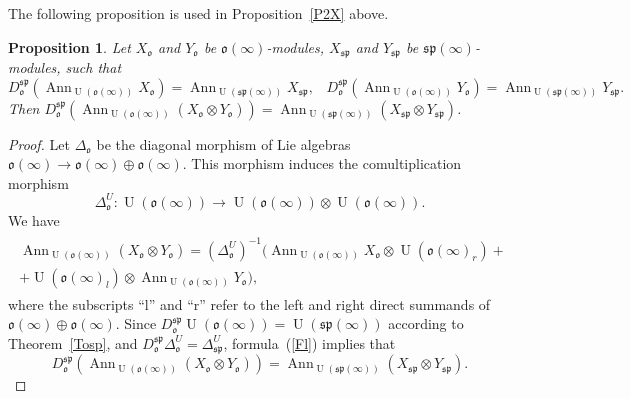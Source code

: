 \documentclass{emsprocart}
\newtheorem{proposition}[theorem]{Proposition}
\begin{document}
The following proposition is used in Proposition~\ref{P2X} above.
\begin{proposition}\label{Ltd}Let $X_\mathfrak o$ and $Y_\mathfrak o$ be $\mathfrak o(\infty)$-modules, $X_{\mathfrak{sp}}$ and $Y_{\mathfrak{sp}}$ be $\mathfrak{sp}(\infty)$-modules, such that $$D_\mathfrak o^\mathfrak{sp}(\operatorname{Ann}_{\operatorname{U}(\mathfrak o(\infty))}X_\mathfrak o)=\operatorname{Ann}_{\operatorname{U}(\mathfrak{sp}(\infty))}X_\mathfrak{sp},\hspace{10pt}D_\mathfrak o^\mathfrak{sp}(\operatorname{Ann}_{\operatorname{U}(\mathfrak o(\infty))}Y_\mathfrak o)=\operatorname{Ann}_{\operatorname{U}(\mathfrak{sp}(\infty))}Y_\mathfrak{sp}.$$ Then $D_\mathfrak o^\mathfrak{sp}(\operatorname{Ann}_{\operatorname{U}(\mathfrak o(\infty))}(X_\mathfrak o\otimes Y_\mathfrak o))=\operatorname{Ann}_{\operatorname{U}(\mathfrak{sp}(\infty))}(X_\mathfrak{sp}\otimes Y_{\mathfrak{sp}})$.\end{proposition}
\begin{proof}%
Let $\Delta_\mathfrak o$ be the diagonal morphism of Lie algebras $\mathfrak o(\infty)\to\mathfrak o(\infty)\oplus\mathfrak o(\infty)$. This morphism induces the comultiplication morphism
$$\Delta_\mathfrak o^U: \operatorname{U}(\mathfrak o(\infty))\to \operatorname{U}(\mathfrak o(\infty))\otimes\operatorname{U}(\mathfrak o(\infty)).$$We have
\begin{eqnarray}\begin{aligned}\label{Fl}\operatorname{Ann}_{\operatorname{U}(\mathfrak o(\infty))}(X_\mathfrak o\otimes Y_\mathfrak o)=(\Delta^U_\mathfrak o)^{-1}(\operatorname{Ann}_{\operatorname{U}(\mathfrak o(\infty))}X_\mathfrak o\otimes\operatorname{U}(\mathfrak o(\infty)_r)+\\+\operatorname{U}(\mathfrak o(\infty)_l)\otimes\operatorname{Ann}_{\operatorname{U}(\mathfrak o(\infty))}Y_\mathfrak o),\end{aligned}\end{eqnarray}where the subscripts ``l'' and ``r'' refer to the left and right direct summands of $\mathfrak o(\infty)\oplus\mathfrak o(\infty)$.
Since $D_\mathfrak o^\mathfrak{sp}\operatorname{U}(\mathfrak o(\infty))=\operatorname{U}(\mathfrak{sp}(\infty))$ according to Theorem~\ref{Tosp}, and $D_\mathfrak o^\mathfrak{sp}\Delta_\mathfrak o^U=\Delta_\mathfrak{sp}^U
$, formula~(\ref{Fl}) implies that $$D_\mathfrak o^\mathfrak{sp}(\operatorname{Ann}_{\operatorname{U}(\mathfrak o(\infty))}(X_\mathfrak o\otimes Y_\mathfrak o))=\operatorname{Ann}_{\operatorname{U}(\mathfrak{sp}(\infty))}(X_\mathfrak{sp}\otimes Y_{\mathfrak{sp}}).$$
\end{proof}
\end{document}
